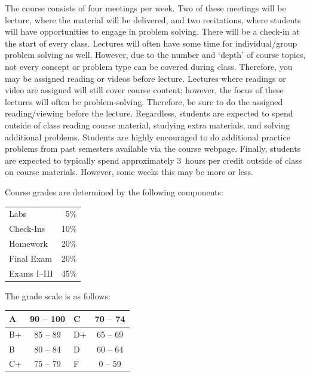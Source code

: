 \documentclass[11pt,letterpaper]{article}
\begin{document}
The course consists of four meetings per week. Two of these meetings will be lecture, where the material will be delivered, and two recitations, where students will have opportunities to engage in problem solving. There will be a check-in at the start of every class. Lectures will often have some time for individual/group problem solving as well. However, due to the number and `depth' of course topics, not every concept or problem type can be covered during class. Therefore, you may be assigned reading or videos before lecture. Lectures where readings or video are assigned will still cover course content; however, the focus of these lectures will often be problem-solving. Therefore, be sure to do the assigned reading/viewing before the lecture. Regardless, students are expected to spend outside of class reading course material, studying extra materials, and solving additional problems. Students are highly encouraged to do additional practice problems from past semesters available via the course webpage. Finally, students are expected to typically spend approximately 3~hours per credit outside of class on course materials. However, some weeks this may be more or less. 
\par\vspace{0.4cm}








Course grades are determined by the following components: \par
	\begin{table}[!ht]
        \begin{tabular}{lr}
        Labs & 5\% \\
	Check-Ins & 10\% \\
	Homework & 20\% \\
	Final Exam & 20\% \\
	Exams I--III & 45\% \\
        \end{tabular} 
        \end{table}
\sectionbreak




The grade scale is as follows: \par
        \begin{table}[!ht]
        \centering
        \begin{tabular}{|l||c|l||c|} \hline
        A & 90 -- 100 & C & 70 -- 74 \\ \hline
        B+ & 85 -- 89 & D+ & 65 -- 69 \\ \hline
        B & 80 -- 84 & D & 60 -- 64 \\ \hline
        C+ & 75 -- 79 & F & 0 -- 59 \\ \hline
        \end{tabular}
        \end{table} 
\sectionbreak
\end{document}
